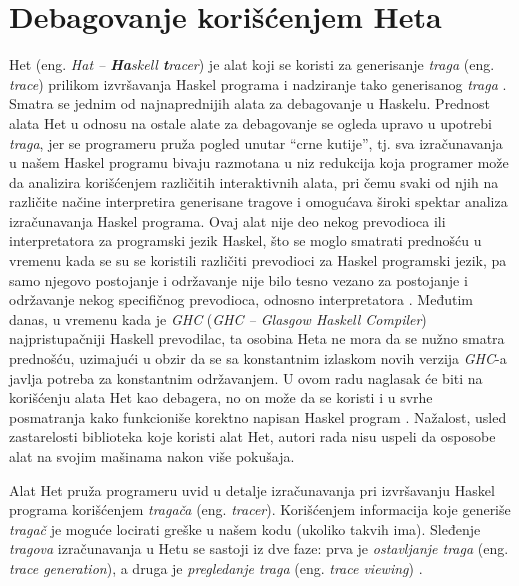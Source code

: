 \documentclass[a4paper]{article}
\begin{document}
\section{Debagovanje korišćenjem Heta}
Het (eng. {\em Hat -- {\bf \em Ha}skell {\bf \em t}racer}) je alat koji se koristi za generisanje {\em traga} (eng. {\em trace}) prilikom izvršavanja Haskel programa
i nadziranje tako generisanog {\em traga} \cite{chitil2002transforming}. Smatra se jednim od najnaprednijih alata za debagovanje u Haskelu. Prednost alata Het u odnosu na ostale alate za debagovanje 
se ogleda upravo u upotrebi {\em traga}, jer se programeru pruža pogled unutar ``crne kutije'', tj. sva izračunavanja u našem Haskel programu bivaju razmotana u niz redukcija koja programer može da analizira korišćenjem različitih interaktivnih alata, pri čemu svaki od njih na različite načine interpretira generisane tragove i omogućava široki spektar analiza izračunavanja Haskel programa.
Ovaj alat nije deo nekog prevodioca ili interpretatora za programski jezik Haskel,
što se moglo smatrati prednošću u vremenu kada se su se koristili različiti prevodioci za Haskel programski jezik, pa samo njegovo postojanje i održavanje nije bilo tesno vezano za postojanje i održavanje nekog specifičnog prevodioca, odnosno interpretatora \cite{chitil2002transforming}. Međutim danas, u vremenu kada je {\em GHC} ({\em GHC -- Glasgow Haskell Compiler}) najpristupačniji Haskell prevodilac, ta osobina Heta ne mora da se nužno smatra prednošću, uzimajući u obzir da se sa konstantnim izlaskom novih verzija {\em GHC}-a javlja potreba za konstantnim održavanjem.
U ovom radu naglasak će biti na korišćenju alata Het kao debagera, no on može da se koristi i u svrhe posmatranja kako funkcioniše korektno napisan Haskel program \cite{wallace2001multiple}.
Nažalost, usled zastarelosti biblioteka koje koristi alat Het, autori rada nisu uspeli da osposobe alat na svojim mašinama nakon više pokušaja. 

Alat Het pruža programeru uvid u detalje izračunavanja pri izvršavanju Haskel programa korišćenjem {\em tragača} (eng. {\em tracer}). 
Korišćenjem informacija koje generiše {\em tragač} je moguće locirati greške u našem kodu (ukoliko takvih ima).
Sleđenje {\em tragova} izračunavanja u Hetu se sastoji iz dve faze: prva je {\em ostavljanje traga} (eng. {\em trace generation}), a druga je {\em pregledanje traga} (eng. {\em trace viewing}) \cite{chitil2002transforming}.
\end{document}
